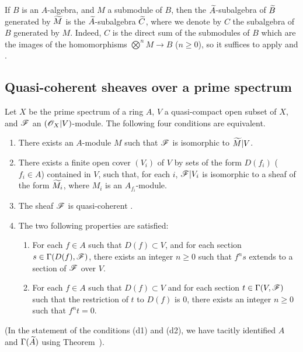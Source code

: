\begin{env}[1.3.14]
\label{1.1.3.14}
If $B$ is an $A$-algebra, and $M$ a submodule of $B$, then the ${\widetilde{A}}$-subalgebra of ${\widetilde{B}}$ generated by ${\widetilde{M}}$  is the ${\widetilde{A}}$-subalgebra ${\widetilde{C}}$, where we denote by $C$ the subalgebra of $B$ generated by $M$.
Indeed, $C$ is the direct sum of the submodules of $B$ which are the images of the homomorphisms $\bigotimes^n M\to B$ ($n\geqslant 0$), so it suffices to apply  and .
\end{env}

\subsection{Quasi-coherent sheaves over a prime spectrum}
\label{subsection-qcoh-sheaves-over-spec}

\begin{thm}[1.4.1]
\label{1.1.4.1}
Let $X$ be the prime spectrum of a ring $A$, $V$ a quasi-compact open subset of $X$, and $\mathscr{F}$ an $(\mathscr{O}_X|V)$-module.
The following four conditions are equivalent.
\begin{enumerate}[label=\emph{(\alph*)}]
  \item There exists an $A$-module $M$ such that $\mathscr{F}$ is isomorphic to ${\widetilde{M}}|V$.
  \item There exists a finite open cover $(V_i)$ of $V$ by sets of the form $D(f_i)$ ($f_i\in A$) contained in $V$, such that, for each $i$, $\mathscr{F}|V_i$ is isomorphic to a sheaf of the form ${\widetilde{M_i}}$, where $M_i$ is an $A_{f_i}$-module.
  \item The sheaf $\mathscr{F}$ is quasi-coherent .
  \item The two following properties are satisfied:
    \begin{enumerate}[label=\emph{(d\arabic*)}]
      \item For each $f\in A$ such that $D(f)\subset V$, and for each section $s\in\Gamma(D(f),\mathscr{F})$, there exists an integer $n\geqslant 0$ such that $f^n s$ extends to a section of $\mathscr{F}$ over $V$.
      \item For each $f\in A$ such that $D(f)\subset V$ and for each section $t\in\Gamma(V,\mathscr{F})$ such that the restriction of $t$ to $D(f)$ is $0$, there exists an integer $n\geqslant 0$ such that $f^n t=0$.
    \end{enumerate}
\end{enumerate}
\end{thm}
(In the statement of the conditions (d1) and (d2), we have tacitly identified $A$ and $\Gamma({\widetilde{A}})$ using Theorem~).

